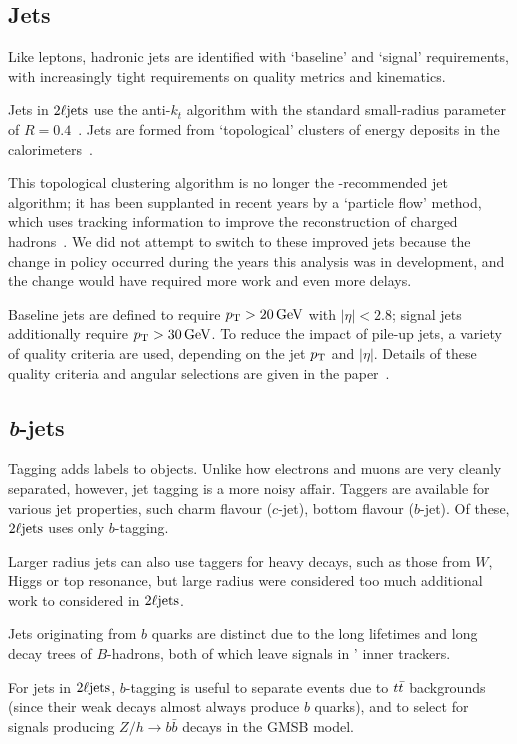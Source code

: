 \subsection{Jets}
Like leptons, hadronic jets are identified with `baseline' and `signal'
requirements, with increasingly tight requirements on quality metrics and
kinematics.

Jets in $\twoljets$ use the anti-$k_t$ algorithm with the standard small-radius
parameter of $R=0.4$~\cite{jet_anti_kt}.
Jets are formed from `topological' clusters of energy deposits in the
calorimeters~\cite{atlas_jet_topo_PERF_2014_07}.

This topological clustering algorithm is no longer the \atlas-recommended jet
algorithm; it has been supplanted in recent years by a `particle flow' method,
which uses tracking information to improve the reconstruction of charged
hadrons~\cite{atlas_jet_pflow_PERF_2015_09}.
We did not attempt to switch to these improved jets because the change in
policy occurred during the years this analysis was in development, and the
change would have required more work and even more delays.

Baseline jets are defined to require $\pt > 20\,\eV[G]$ with $|\eta| < 2.8$;
signal jets additionally require $\pt > 30\,\eV[G]$.
To reduce the impact of pile-up jets, a variety of quality criteria are used,
depending on the jet $\pt$ and $|\eta|$.
Details of these quality criteria and angular selections are given in the
paper~\cite{atlas2022searches}.


\subsection{\textit{b}-jets}
\label{sec:2ljets_btagging}
Tagging adds labels to objects.
Unlike how electrons and muons are very cleanly separated, however, jet tagging
is a more noisy affair.
Taggers are available for various jet properties, such charm flavour ($c$-jet),
bottom flavour ($b$-jet).
Of these, $\twoljets$ uses only $b$-tagging.

Larger radius jets can also use taggers for heavy decays, such as those from
$W$, Higgs or top resonance, but large radius were considered too much
additional work to considered in $\twoljets$.

Jets originating from $b$ quarks are distinct due to the long lifetimes and
long decay trees of $B$-hadrons, both of which leave signals in \atlas'
inner trackers.

For jets in $\twoljets$, $b$-tagging is useful to separate events due to
$\ttbar$ backgrounds (since their weak decays almost always produce $b$
quarks), and to select for signals producing $Z/h \rightarrow b\bar b$ decays
in the GMSB model.

